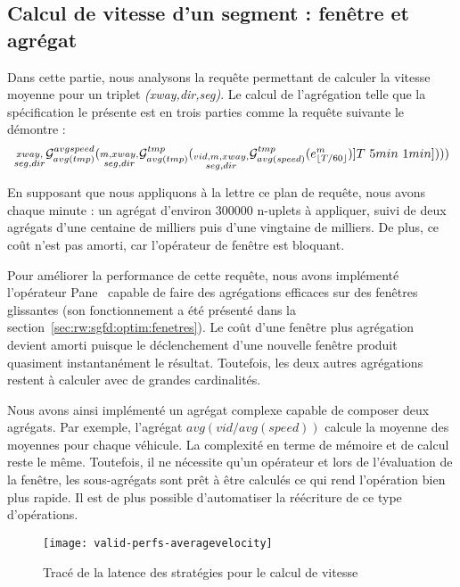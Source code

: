 \subsection{Calcul de vitesse d'un segment : fenêtre et agrégat}
Dans cette partie, nous analysons la requête permettant de calculer la vitesse moyenne pour un triplet \textit{(xway,dir,seg)}. Le calcul de l'agrégation telle que la spécification le présente est en trois parties comme la requête suivante le démontre :
$$\null_{\substack{xway,\\ seg,dir}}\G_{avg(tmp)}^{avgspeed}(\null_{\substack{m,xway,\\ seg,dir}}\G_{avg(tmp)}^{tmp}(\null_{\substack{vid,m,xway,\\ seg,dir}}\G_{avg(speed)}^{tmp} (e_{\lfloor T/60 \rfloor}^{m})]T\ 5min\ 1min])))$$

En supposant que nous appliquons à la lettre ce plan de requête, nous avons chaque minute : un agrégat d'environ 300000 n-uplets à appliquer, suivi de deux agrégats d'une centaine de milliers puis d'une vingtaine de milliers. De plus, ce coût n'est pas amorti, car l'opérateur de fenêtre est bloquant.

Pour améliorer la performance de cette requête, nous avons implémenté l'opérateur Pane~\cite{Li:pane} capable de faire des agrégations efficaces sur des fenêtres glissantes (son fonctionnement a été présenté dans la section~\ref{sec:rw:sgfd:optim:fenetres}). Le coût d'une fenêtre plus agrégation devient amorti puisque le déclenchement d'une nouvelle fenêtre produit quasiment instantanément le résultat. Toutefois, les deux autres agrégations restent à calculer avec de grandes cardinalités.

Nous avons ainsi implémenté un agrégat complexe capable de composer deux agrégats. Par exemple, l'agrégat $avg(vid/avg(speed))$ calcule la moyenne des moyennes pour chaque véhicule. La complexité en terme de mémoire et de calcul reste le même. Toutefois, il ne nécessite qu'un opérateur et lors de l'évaluation de la fenêtre, les sous-agrégats sont prêt à être calculés ce qui rend l'opération bien plus rapide. Il est de plus possible d'automatiser la réécriture de ce type d'opérations.

\begin{figure}[ht]
\centering
\texttt{[image: valid-perfs-averagevelocity]}
\caption{Tracé de la latence des stratégies pour le calcul de vitesse}\label{fig:valid:perfs:averagevelocity}
\end{figure}

